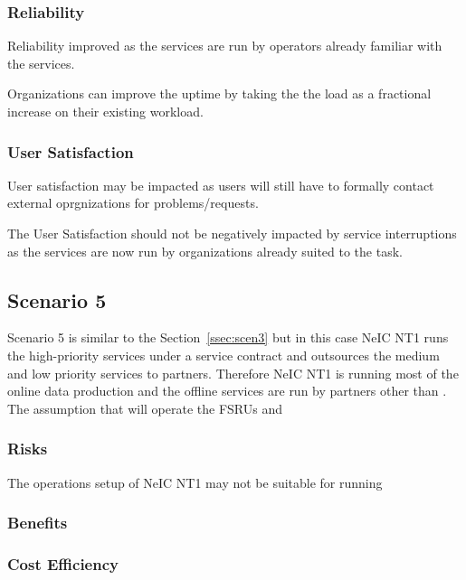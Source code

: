 \documentclass[12pt,a4paper]{article}
\begin{document}
\subsubsection*{Reliability}
\bitm
\item Reliability improved as the services are run by operators already familiar with the services.
\item Organizations can improve the uptime by taking the the \ED load as a fractional increase on their existing workload.
\eitm

\subsubsection*{User Satisfaction}
\bitm
\item User satisfaction may be impacted as \EC users will still have to formally contact external oprgnizations for problems/requests.
\item The User Satisfaction should not be negatively impacted by service interruptions as the services are now
  run by organizations already suited to the task.
\eitm
  
\subsection{Scenario 5}
\label{ssec:scen5}

Scenario 5 is similar to the Section~\ref{ssec:scen3} but in this case
NeIC NT1 runs the high-priority services under a service contract and \EC outsources the medium and low priority services to partners.
Therefore NeIC NT1 is running most of the online data production and the offline services are run by partners other than \EC.
The assumption that \EC will operate the FSRUs and 

\subsubsection*{Risks}
\bitm
\item The operations setup of NeIC NT1 may not be suitable for running
\eitm

\subsubsection*{Benefits}
\bitm
\item 
\eitm

\subsubsection*{Cost Efficiency}
\bitm
\item 
\eitm
\end{document}
